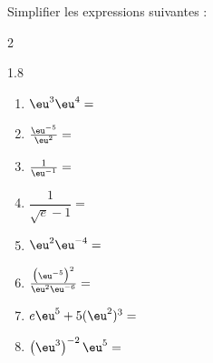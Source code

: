 \documentclass[main.tex]{subfiles}
\begin{document}
\begin{exercise} \label{chapter06:exercice:exponential01}	Simplifier les expressions suivantes :\vspace{-0.5em}
\begin{multicols}{2}
	\begin{spacing}{1.8}
		\begin{enumerate}[leftmargin=*,label={}]
			\item $\eu^3 \eu^4=$\dotfill 
			\item $\frac{\eu^{-5}}{\eu^2}=\dotfill $
			\item $\frac{1}{\eu^{-1}}=$\dotfill
			\item $\dfrac{1}{\sqrt{e}-1}=$\dotfill
			\item $\eu^2\eu^{-4}=$\dotfill
			\item $\frac{\big(\eu^{-5}\big)^2}{\eu^2\eu^{-6}}=\dotfill $ 
			\item $e\eu^5+5(\eu^2)^3=$\dotfill
			\item $\left(\eu^3\right)^{-2} \eu^5=$\dotfill  
		\end{enumerate}
	\end{spacing}
\end{multicols} \vspace{-0.5em}
\end{exercise}  
\end{document}

